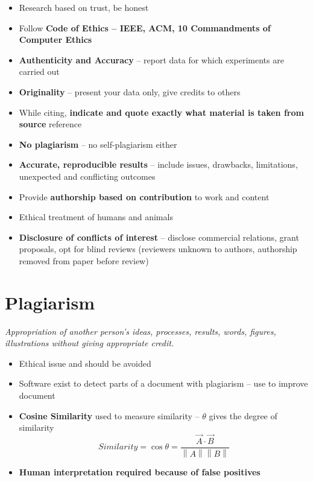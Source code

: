 \documentclass{article}
\begin{document}
\begin{itemize}
    \item Research based on trust, be honest
    \item Follow \textbf{Code of Ethics -- IEEE, ACM, 10 Commandments of Computer Ethics}
    \item \textbf{Authenticity and Accuracy} -- report data for which experiments are carried out
    \item \textbf{Originality} -- present your data only, give credits to others
    \item While citing, \textbf{indicate and quote exactly what material is taken from source} reference
    \item \textbf{No plagiarism} -- no self-plagiarism either
    \item \textbf{Accurate, reproducible results} -- include issues, drawbacks, limitations, unexpected and conflicting outcomes
    \item Provide \textbf{authorship based on contribution} to work and content
    \item Ethical treatment of humans and animals
    \item \textbf{Disclosure of conflicts of interest} -- disclose commercial relations, grant proposals, opt for blind reviews (reviewers unknown to authors, authorship removed from paper before review)
\end{itemize}

\section{Plagiarism}

\textit{Appropriation of another person’s ideas, processes, results, words, figures, illustrations without giving appropriate credit.}

\begin{itemize}
    \item Ethical issue and should be avoided
    \item Software exist to detect parts of a document with plagiarism -- use to improve document
    \item \textbf{Cosine Similarity} used to measure similarity -- $\theta$ gives the degree of similarity
    \begin{equation}
        Similarity = \cos \theta = \frac{\Vec{A}\cdot \Vec{B}}{\left \| A \right \|\left \| B \right \|}
    \end{equation}
    \item \textbf{Human interpretation required because of false positives}
\end{itemize}
\end{document}
